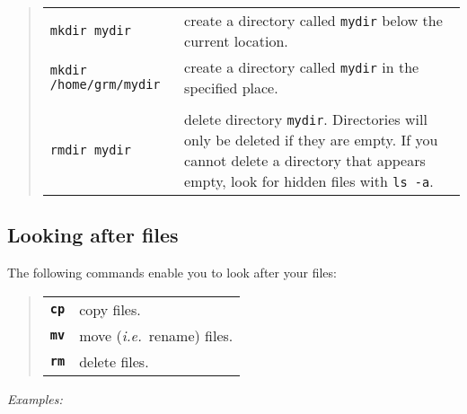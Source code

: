 \begin{quote}
\begin{tabular}{lp{3.9in}}

{\tt mkdir mydir}     & create a directory called {\tt mydir} below the current
                           location. \\

{\tt mkdir /home/grm/mydir} & create a directory called {\tt mydir} in the
                                 specified place. \\
\\
{\tt rmdir mydir} & delete directory {\tt mydir}. Directories
                       will only be deleted if they are empty.  If you cannot
                       delete a directory that appears empty, look
                       for hidden files with {\tt ls -a}.

\end{tabular}
\end{quote}

\subsection{Looking after files}

The following commands enable you to look after your files:

\begin{quote}
\begin{tabular}{lp{5.2in}}

{\tt\bf cp}  & copy files. \\

{\tt\bf mv}  & move ({\em i.e.}\, rename) files. \\

{\tt\bf rm}  & delete files.

\end{tabular}
\end{quote}

{\em Examples:}

